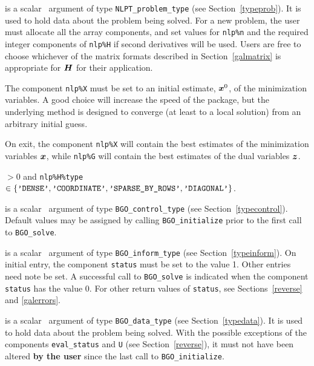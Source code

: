 \documentclass{galahad}
\newcommand{\packagename}{BGO}
\begin{document}
\vspace*{-2mm}
\begin{description}
 is a scalar \intentinout\ argument of type
{\tt NLPT\_problem\_type}
(see Section~\ref{typeprob}).
It is used to hold data about the problem being solved.
For a new problem, the user must allocate all the array components,
and set values for {\tt nlp\%n}
and the required integer components of {\tt nlp\%H} if second derivatives
will be used.
Users are free to choose whichever
of the matrix formats described in Section~\ref{galmatrix}
is appropriate for ${\bm{H}}$ for their application.

\noindent
The component {\tt nlp\%X} must be set to an initial estimate, ${\bm{x}}^{0}$,
of the minimization variables. A good choice will increase the speed
of the package, but the underlying method is designed to converge (at least
to a local solution) from an arbitrary initial guess.

\noindent
On exit, the component {\tt nlp\%X} will contain the best estimates of the
minimization variables ${\bm{x}}$, while {\tt nlp\%G} will contain the best 
estimates of the dual variables ${\bm{z}}$.

\noindent
{} $> 0$ and
{\tt nlp\%H\%type} $\in \{
  \mbox{\tt 'DENSE'}, \mbox{\tt 'COORDINATE'}, \mbox{\tt 'SPARSE\_BY\_ROWS'},
  \mbox{\tt 'DIAGONAL'} \}$.

 is a scalar \intentin\ argument of type
{\tt \packagename\_control\_type}
(see Section~\ref{typecontrol}). Default values may be assigned by calling
{\tt \packagename\_initialize} prior to the first call to
{\tt \packagename\_solve}. 

 is a scalar \intentinout\ argument of type
{\tt \packagename\_inform\_type}
(see Section~\ref{typeinform}).
On initial entry, the  component {\tt status} must be set to the value 1.
Other entries need note be set.
A successful call to
{\tt \packagename\_solve}
is indicated when the  component {\tt status} has the value 0.
For other return values of {\tt status}, see Sections~\ref{reverse} and
\ref{galerrors}.

 is a scalar \intentinout\ argument of type
{\tt \packagename\_data\_type}
(see Section~\ref{typedata}). It is used to hold data about the problem being
solved. With the possible exceptions of the components
{\tt eval\_status} and {\tt U} (see Section~\ref{reverse}),
it must not have been altered {\bf by the user} since the last call to
{\tt \packagename\_initialize}.


\end{description}
\end{document}
